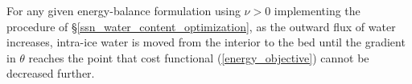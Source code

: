 For any given energy-balance formulation using $\nu > 0$ implementing the procedure of \S \ref{ssn_water_content_optimization}, as the outward flux of water increases, intra-ice water is moved from the interior to the bed until the gradient in $\theta$ reaches the point that cost functional (\ref{energy_objective}) cannot be decreased further.


